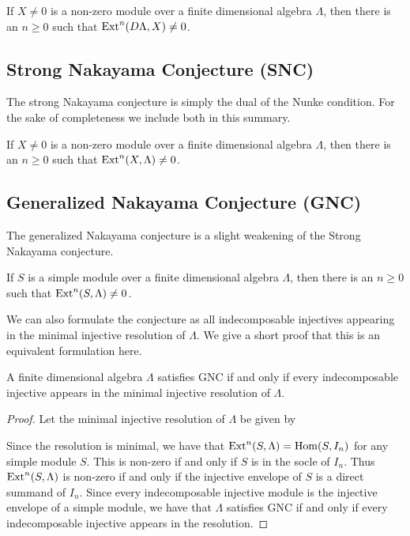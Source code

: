 \begin{conj} 
	If $X \neq 0$ is a non-zero module over a finite dimensional algebra $\Lambda$, then there is an $n \geq 0$ such that $\operatorname{Ext}^n(D\Lambda, X) \neq 0$. 
\end{conj}

\subsection*{Strong Nakayama Conjecture (SNC)}
The strong Nakayama conjecture is simply the dual of the Nunke condition. For the sake of completeness we include both in this summary.

\begin{conj} 
	If $X \neq 0$ is a non-zero module over a finite dimensional algebra $\Lambda$, then there is an $n \geq 0$ such that $\operatorname{Ext}^n(X,\Lambda) \neq 0$. 
\end{conj}

\subsection*{Generalized Nakayama Conjecture (GNC)}
The generalized Nakayama conjecture is a slight weakening of the Strong Nakayama conjecture.

\begin{conj} 
	If $S$ is a simple module over a finite dimensional algebra $\Lambda$, then there is an $n \geq 0$ such that $\operatorname{Ext}^n(S, \Lambda) \neq 0$. 
\end{conj}

We can also formulate the conjecture as all indecomposable injectives appearing in the minimal injective resolution of $\Lambda$. We give a short proof that this is an equivalent formulation here.

\begin{prop}\label{prop:GNC_reformulated}
	A finite dimensional algebra $\Lambda$ satisfies GNC if and only if every indecomposable injective appears in the minimal injective resolution of $\Lambda$.
	\begin{proof}
		Let the minimal injective resolution of $\Lambda$ be given by 
		\begin{center}
		\end{center}
		Since the resolution is minimal, we have that $\operatorname{Ext}^n(S, \Lambda) = \operatorname{Hom}(S, I_n)$ for any simple module $S$. This is non-zero if and only if $S$ is in the socle of $I_n$. Thus $\operatorname{Ext}^n(S, \Lambda)$ is non-zero if and only if the injective envelope of $S$ is a direct summand of $I_n$. Since every indecomposable injective module is the injective envelope of a simple module, we have that $\Lambda$ satisfies GNC if and only if every indecomposable injective appears in the resolution.
	\end{proof}
\end{prop}

